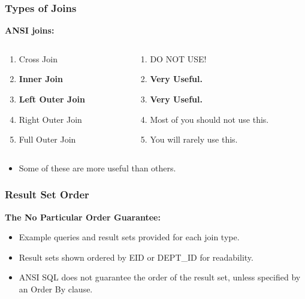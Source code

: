 \documentclass{beamer}
\begin{document}
\begin{frame} %
  \frametitle{Types of Joins}

  \textbf{ANSI joins:}

  \smallskip

  \begin{columns}

    \begin{column}{.5\textwidth}
      \begin{enumerate}
      \item {\color{red}Cross Join}
      \item \textbf{Inner Join}
      \item \textbf{Left Outer Join}
      \item Right Outer Join
      \item Full Outer Join
      \end{enumerate}
    \end{column}
    
    \begin{column}{.5\textwidth}
      \begin{enumerate}
      \item {\color{red}DO NOT USE\@!}
      \item \textbf{Very Useful.}
      \item \textbf{Very Useful.}
      \item Most of you should not use this.
      \item You will rarely use this.
      \end{enumerate}
    \end{column}

  \end{columns}

  \bigskip
  \bigskip
  \bigskip
  \begin{itemize}
  \item Some of these are more useful than others.
  \end{itemize}
  

\end{frame}  

\begin{frame}
  \frametitle{Result Set Order}
  
  \textbf{The No Particular Order Guarantee:}

  \begin{itemize}
  \item Example queries and result sets provided for each join type.
  \item Result sets shown ordered by EID or DEPT\_ID for readability.
  \item ANSI SQL does not guarantee the order of the result set,
    unless specified by an Order By clause.
  \end{itemize}

\end{frame}
\end{document}
